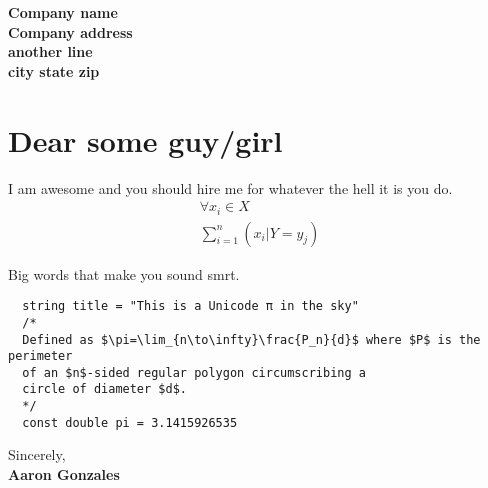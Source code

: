 \documentclass[12pt]{friggeri-cv-coverletter} %
\begin{document}

\textbf{Company name} \\
\textbf{Company address} \\
\textbf{another line} \\
\textbf{city state zip} \\

\section{Dear some guy/girl}

I am awesome and you should hire me for whatever the hell it is you do. 
\begin{align}
  \forall x_i \in X \\
  \sum_{i=1}^n \left(x_i | Y = y_j\right)
\end{align}
  
Big words that make you sound smrt.

\begin{verbatim}
  string title = "This is a Unicode π in the sky"
  /*
  Defined as $\pi=\lim_{n\to\infty}\frac{P_n}{d}$ where $P$ is the perimeter
  of an $n$-sided regular polygon circumscribing a
  circle of diameter $d$.
  */
  const double pi = 3.1415926535
\end{verbatim}
Sincerely, \\
\textbf{Aaron Gonzales}

\end{document}
